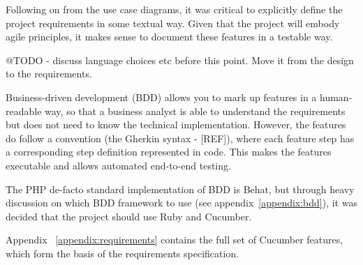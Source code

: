 Following on from the use case diagrams, it was critical to explicitly define the project requirements in some textual way. Given that the project will embody agile principles, it makes sense to document these features in a testable way.

@TODO - discuss language choices etc before this point. Move it from the design to the requirements.

Business-driven development (BDD) allows you to mark up features in a human-readable way, so that a business analyst is able to understand the requirements but does not need to know the technical implementation. However, the features do follow a convention (the Gherkin syntax - [REF]), where each feature step has a corresponding step definition represented in code. This makes the features executable and allows automated end-to-end testing.

The PHP de-facto standard implementation of BDD is Behat, but through heavy discussion on which BDD framework to use (see appendix~\ref{appendix:bdd}), it was decided that the project should use Ruby and Cucumber.

Appendix ~\ref{appendix:requirements} contains the full set of Cucumber features, which form the basis of the requirements specification.